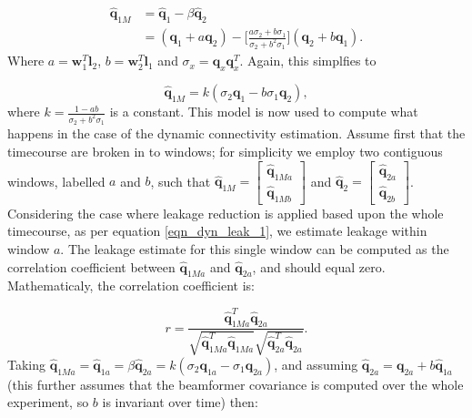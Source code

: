 \begin{equation}
\begin{aligned}
\hat{\mathbf{q}}_{1M} &= \hat{\mathbf{q}}_{1} - \beta\hat{\mathbf{q}}_{2}\\
&= (\mathbf{q}_{1} + a\mathbf{q}_{2})-\Bigg[\frac{a\sigma_2+b\sigma_1}{\sigma_2+b^2\sigma_1}\Bigg](\mathbf{q}_{2} + b\mathbf{q}_{1}).
\end{aligned}
\label{eqn_dyn_leak_1}
\end{equation} Where $a = \mathbf{w}^T_1\mathbf{l}_2$, $b = \mathbf{w}^T_2\mathbf{l}_1$ and $\sigma_x = \mathbf{q}_{x}\mathbf{q}_{x}^T$. Again, this simplfies to

\begin{equation}
\hat{\mathbf{q}}_{1M} = k(\sigma_2\mathbf{q}_1 - b\sigma_1\mathbf{q}_2),
\end{equation} where $k = \frac{1-ab}{\sigma_2+b^2\sigma_1}$ is a constant.  This model is now used to compute what happens in the case of the dynamic connectivity estimation. Assume first that the timecourse are broken in to windows; for simplicity we employ two contiguous windows, labelled $ a $ and $ b $, such that $\hat{\mathbf{q}}_{1M} = \begin{bmatrix}\hat{\mathbf{q}}_{1Ma}\\\hat{\mathbf{q}}_{1Mb}\end{bmatrix}$ and $\hat{\mathbf{q}}_{2} = \begin{bmatrix}\hat{\mathbf{q}}_{2a}\\\hat{\mathbf{q}}_{2b}\end{bmatrix}$. Considering the case where leakage reduction is applied based upon the whole timecourse, as per equation \ref{eqn_dyn_leak_1}, we estimate leakage within window $ a $. The leakage estimate for this single window can be computed as the correlation coefficient between $\hat{\mathbf{q}}_{1Ma}$ and $\hat{\mathbf{q}}_{2a}$, and should equal zero. Mathematicaly, the correlation coefficient is:

\begin{equation}
r = \frac{\hat{\mathbf{q}}_{1Ma}^T\hat{\mathbf{q}}_{2a}}{\sqrt{\hat{\mathbf{q}}_{1Ma}^T\hat{\mathbf{q}}_{1Ma}}\sqrt{\hat{\mathbf{q}}_{2a}^T\hat{\mathbf{q}}_{2a}}}.
\end{equation} Taking $\hat{\mathbf{q}}_{1Ma} = \hat{\mathbf{q}}_{1a} = \beta\hat{\mathbf{q}}_{2a} = k(\sigma_2\mathbf{q}_{1a} - \sigma_1\mathbf{q}_{2a})$, and assuming $\hat{\mathbf{q}}_{2a} = \mathbf{q}_{2a}+b\hat{\mathbf{q}}_{1a}$ (this further assumes that the beamformer covariance is computed over the whole experiment, so $b$ is invariant over time) then:

